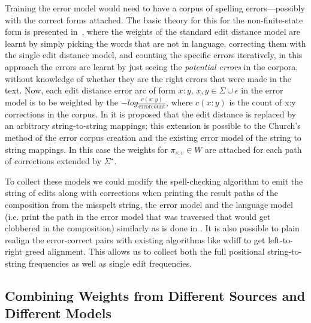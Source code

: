 \documentclass[a4paper,12pt]{article}
\begin{document}
Training the error model would need to have a corpus of spelling
errors---possibly with the correct forms attached. The basic theory for this
for the non-finite-state form is presented in~\cite{church1991probability},
where the weights of the standard edit distance model are learnt by simply
picking the words that are not in language, correcting them with the single
edit distance model, and counting the specific errors iteratively, in this
approach the errors are learnt by just seeing the \emph{potential errors} in
the corpora, without knowledge of whether they are the right errors that were
made in the text.  Now, each edit distance error arc of form $x:y$, $x, y \in
\Sigma \cup {\epsilon}$ in the error model is to be weighted by the $-log
\frac{c(x:y)}{\mathrm{error count}}$, where $c(x:y)$ is the count of x:y
corrections in the corpus. In \cite{brill2000improved} it is proposed that the
edit distance is replaced by an arbitrary string-to-string mappings; this
extension is possible to the Church's method of the error corpus creation and
the existing error model of the string to string mappings. In this case the
weights for $\pi_{s:v} \in W$ are attached for each path of corrections
extended by $\Sigma^{\star}$. 

To collect these models we could modify the spell-checking algorithm to emit
the string of edits along with corrections when printing the result paths of
the composition from the misspelt string, the error model and the language
model (i.e. print the path in the error model that was traversed that would get
clobbered in the composition) similarly as is done in
\cite{ristad1998learning}. It is also possible to plain realign the
error-correct pairs with existing algorithms like wdiff to get left-to-right
greed alignment. This allows us to collect both the full positional
string-to-string frequencies as well as single edit frequencies.

\subsection{Combining Weights from Different Sources and Different Models}
\label{subsec:combining-weights}
\end{document}
